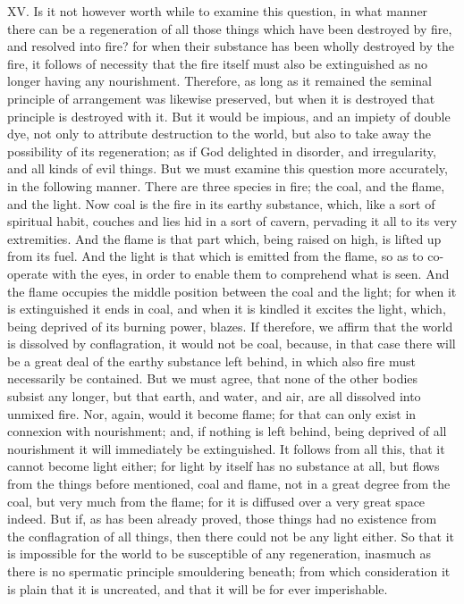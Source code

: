 XV. Is it not however worth while to examine this question, in what manner there can be a
regeneration of all those things which have been destroyed by fire, and resolved into fire? for when
their substance has been wholly destroyed by the fire, it follows of necessity that the fire itself must
also be extinguished as no longer having any nourishment. Therefore, as long as it remained the
seminal principle of arrangement was likewise preserved, but when it is destroyed that principle is
destroyed with it. But it would be impious, and an impiety of double dye, not only to attribute
destruction to the world, but also to take away the possibility of its regeneration; as if God delighted
in disorder, and irregularity, and all kinds of evil things. But we must examine this question more
accurately, in the following manner. There are three species in fire; the coal, and the flame, and the
light. Now coal is the fire in its earthy substance, which, like a sort of spiritual habit, couches and
lies hid in a sort of cavern, pervading it all to its very extremities. And the flame is that part which,
being raised on high, is lifted up from its fuel. And the light is that which is emitted from the flame,
so as to co-operate with the eyes, in order to enable them to comprehend what is seen. And the
flame occupies the middle position between the coal and the light; for when it is extinguished it ends
in coal, and when it is kindled it excites the light, which, being deprived of its burning power, blazes.
If therefore, we affirm that the world is dissolved by conflagration, it would not be coal, because, in
that case there will be a great deal of the earthy substance left behind, in which also fire must
necessarily be contained. But we must agree, that none of the other bodies subsist any longer, but
that earth, and water, and air, are all dissolved into unmixed fire. Nor, again, would it become
flame; for that can only exist in connexion with nourishment; and, if nothing is left behind, being
deprived of all nourishment it will immediately be extinguished. It follows from all this, that it cannot
become light either; for light by itself has no substance at all, but flows from the things before
mentioned, coal and flame, not in a great degree from the coal, but very much from the flame; for it
is diffused over a very great space indeed. But if, as has been already proved, those things had no
existence from the conflagration of all things, then there could not be any light either. So that it is
impossible for the world to be susceptible of any regeneration, inasmuch as there is no spermatic
principle smouldering beneath; from which consideration it is plain that it is uncreated, and that it will
be for ever imperishable.

